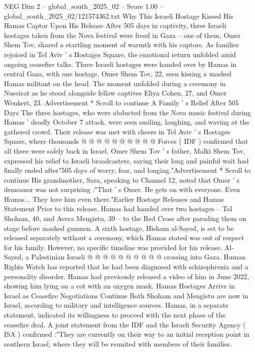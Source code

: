 \begin{textsample}{NEG Dim 2 – global\_south\_2025\_02 – Score 1.00 – global\_south\_2025\_02/121574362.txt}  \label{ex:f2_neg_072}
Why This Israeli Hostage Kissed His Hamas Captor Upon His Release After 505 days in captivity, three Israeli hostages taken from the Nova festival were freed in Gaza -- one of them, Omer Shem Tov, shared a startling moment of warmth with his captors.
As families rejoiced in Tel Aviv ' s Hostages Square, the emotional return unfolded amid ongoing ceasefire talks.
Three Israeli hostages were handed over by Hamas in central Gaza, with one hostage, Omer Shem Tov, 22, seen kissing a masked Hamas militant on the head.
The moment unfolded during a ceremony in Nuseirat as he stood alongside fellow captives Eliya Cohen, 27, and Omer Wenkert, 23.
Advertisement * Scroll to continue A Family ' s Relief After 505 Days The three hostages, who were abducted from the Nova music festival during Hamas ' deadly October 7 attack, were seen smiling, laughing, and waving at the gathered crowd.
Their release was met with cheers in Tel Aviv ' s Hostages Square, where thousands @ @ @ @ @ @ @ @ @ @ Forces ( IDF ) confirmed that all three were safely back in Israel.
Omer Shem Tov ' s father, Malki Shem Tov, expressed his relief to Israeli broadcasters, saying their long and painful wait had finally ended after"505 days of worry, fear, and longing."Advertisement * Scroll to continue His grandmother, Sara, speaking to Channel 12, noted that Omer ' s demeanor was not surprising :"That ' s Omer.
He gets on with everyone.
Even Hamas...
They love him even there."Earlier Hostage Releases and Hamas Statement Prior to this release, Hamas had handed over two hostages -- Tal Shoham, 40, and Avera Mengistu, 39 -- to the Red Cross after parading them on stage before masked gunmen.
A sixth hostage, Hisham al-Sayed, is set to be released separately without a ceremony, which Hamas stated was out of respect for his family.
However, no specific timeline was provided for his release.
Al-Sayed, a Palestinian Israeli @ @ @ @ @ @ @ @ @ @ crossing into Gaza.
Human Rights Watch has reported that he had been diagnosed with schizophrenia and a personality disorder.
Hamas had previously released a video of him in June 2022, showing him lying on a cot with an oxygen mask.
Hamas Hostages Arrive in Israel as Ceasefire Negotiations Continue Both Shoham and Mengistu are now in Israel, according to military and intelligence sources.
Hamas, in a separate statement, indicated its willingness to proceed with the next phase of the ceasefire deal.
A joint statement from the IDF and the Israeli Security Agency ( ISA ) confirmed :"They are currently on their way to an initial reception point in southern Israel, where they will be reunited with members of their families.

\end{textsample}
